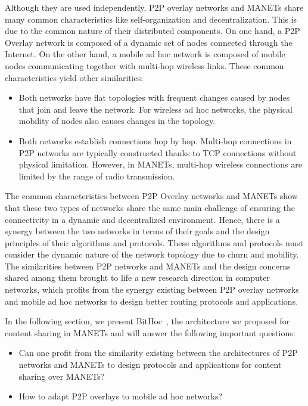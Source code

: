 Although they are used independently, P2P overlay networks and MANETs share many common characteristics like self-organization and decentralization. This is due to the common nature of their distributed components. On one hand, a P2P Overlay network is composed of a dynamic set of nodes connected through the Internet. On the other hand, a mobile ad hoc network is composed of mobile nodes communicating together with multi-hop wireless links. These common characteristics yield other similarities:

\begin{itemize}
\item{Both networks have flat topologies with frequent changes caused by nodes that join and leave the network. For wireless ad hoc networks, the physical mobility of nodes also causes changes in the topology.}
\item{Both networks establish connections hop by hop. Multi-hop connections in P2P networks are typically constructed thanks to TCP connections without physical limitation. However, in MANETs, multi-hop wireless connections are limited by the range of radio transmission.}
\end{itemize}

The common characteristics between P2P Overlay networks and MANETs show that these two types of networks share the same main challenge of ensuring the connectivity in a dynamic and decentralized environment. Hence, there is a synergy between the two networks in terms of their goals and the design principles of their algorithms and protocols.  These algorithms and protocols must consider the dynamic nature of the network topology due to churn and mobility. The similarities between P2P networks and MANETs and the design concerns shared among them brought to life a new research direction in computer networks, which profits from the synergy existing between P2P overlay networks and mobile ad hoc networks to design better routing protocols and applications.

In the following section, we present BitHoc~\cite{BitHoc, BitHocWeb}, the architecture we proposed for content sharing in MANETs and  will answer the following important questions:

\begin{itemize}
\item{Can one profit from the similarity existing between the architectures of P2P networks and MANETs to design protocols and applications for content sharing over MANETs?}
\item{How to adapt P2P overlays to mobile ad hoc networks?}
\end{itemize}

